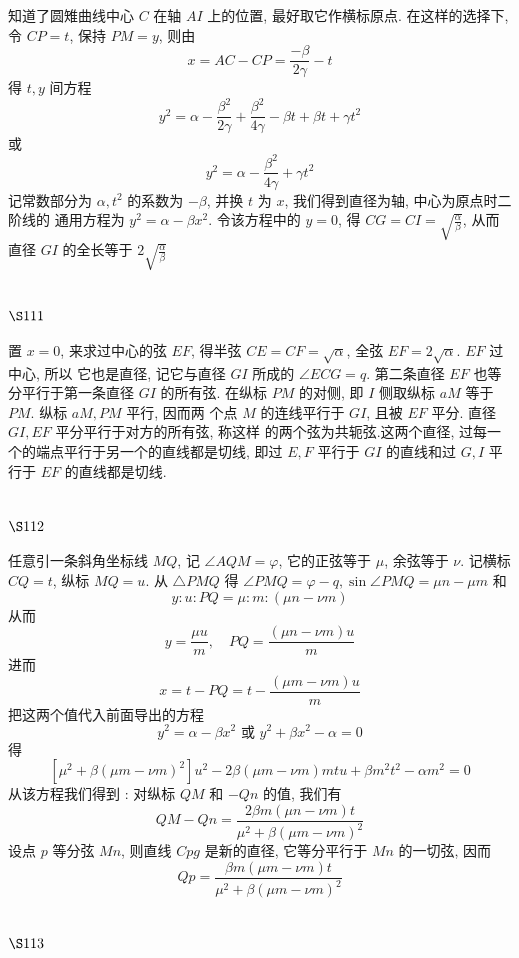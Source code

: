 知道了圆雉曲线中心 $C$ 在轴 $A I$ 上的位置, 最好取它作横标原点. 在这样的选择下, 令 $C P=t$, 保持 $P M=y$, 则由
\[
x=A C-C P=\frac{-\beta}{2 \gamma}-t
\]
得 $t, y$ 间方程
\[
y^{2}=\alpha-\frac{\beta^{2}}{2 \gamma}+\frac{\beta^{2}}{4 \gamma}-\beta t+\beta t+\gamma t^{2}
\]
或
\[
y^{2}=\alpha-\frac{\beta^{2}}{4 \gamma}+\gamma t^{2}
\]
记常数部分为 $\alpha, t^{2}$ 的系数为 $-\beta$, 并换 $t$ 为 $x$, 我们得到直径为轴, 中心为原点时二阶线的 通用方程为 $y^{2}=\alpha-\beta x^{2}$. 令该方程中的 $y=0$, 得 $C G=C I=\sqrt{\frac{\alpha}{\beta}}$, 从而直径 $G I$ 的全长等于 $2 \sqrt{\frac{\alpha}{\beta}}$

\section{$\S 111$}

置 $x=0$, 来求过中心的弦 $E F$, 得半弦 $C E=C F=\sqrt{\alpha}$, 全弦 $E F=2 \sqrt{\alpha}$. $E F$ 过中心, 所以 它也是直径, 记它与直径 $G I$ 所成的 $\angle E C G=q$. 第二条直径 $E F$ 也等分平行于第一条直径 $G I$ 的所有弦. 在纵标 $P M$ 的对侧, 即 $I$ 侧取纵标 $a M$ 等于 $P M$. 纵标 $a M, P M$ 平行, 因而两 个点 $M$ 的连线平行于 $G I$, 且被 $E F$ 平分. 直径 $G I, E F$ 平分平行于对方的所有弦, 称这样 的两个弦为共轭弦.这两个直径, 过每一个的端点平行于另一个的直线都是切线, 即过 $E, F$ 平行于 $G I$ 的直线和过 $G, I$ 平行于 $E F$ 的直线都是切线.

\section{$\S 112$}

任意引一条斜角坐标线 $M Q$, 记 $\angle A Q M=\varphi$, 它的正弦等于 $\mu$, 余弦等于 $\nu$. 记横标 $C Q=t$, 纵标 $M Q=u$. 从 $\triangle P M Q$ 得 $\angle P M Q=\varphi-q, \sin \angle P M Q=\mu n-\mu m$ 和
\[
y: u: P Q=\mu: m:(\mu n-\nu m)
\]
从而
\[
y=\frac{\mu u}{m}, \quad P Q=\frac{(\mu n-\nu m) u}{m}
\]
进而
\[
x=t-P Q=t-\frac{(\mu m-\nu m) u}{m}
\]
把这两个值代入前面导出的方程
\[
y^{2}=\alpha-\beta x^{2} \text { 或 } y^{2}+\beta x^{2}-\alpha=0
\]
得
\[
\left[\mu^{2}+\beta(\mu m-\nu m)^{2}\right] u^{2}-2 \beta(\mu m-\nu m) m t u+\beta m^{2} t^{2}-\alpha m^{2}=0
\]
从该方程我们得到 : 对纵标 $Q M$ 和 $-Q n$ 的值, 我们有
\[
Q M-Q n=\frac{2 \beta m(\mu n-\nu m) t}{\mu^{2}+\beta(\mu m-\nu m)^{2}}
\]
设点 $p$ 等分弦 $M n$, 则直线 $C p g$ 是新的直径, 它等分平行于 $M n$ 的一切弦, 因而
\[
Q p=\frac{\beta m(\mu m-\nu m) t}{\mu^{2}+\beta(\mu m-\nu m)^{2}}
\]
\section{$\S 113$}

